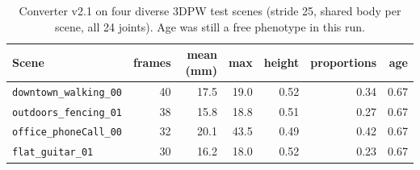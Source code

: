 
\begin{table}[h]
\centering\small
\begin{tabular}{lrrrrrr}
\toprule
Scene & frames & mean (mm) & max & height & proportions & age \\
\midrule
\texttt{downtown\_walking\_00} & 40 & 17.5 & 19.0 & 0.52 & 0.34 & 0.67 \\
\texttt{outdoors\_fencing\_01} & 38 & 15.8 & 18.8 & 0.51 & 0.27 & 0.67 \\
\texttt{office\_phoneCall\_00} & 32 & 20.1 & 43.5 & 0.49 & 0.42 & 0.67 \\
\texttt{flat\_guitar\_01} & 30 & 16.2 & 18.0 & 0.52 & 0.23 & 0.67 \\
\bottomrule
\end{tabular}
\caption{Converter v2.1 on four diverse 3DPW test scenes (stride 25, shared
body per scene, all 24 joints). Age was still a free phenotype in this run.}
\label{tab:fit_scenes}
\end{table}
